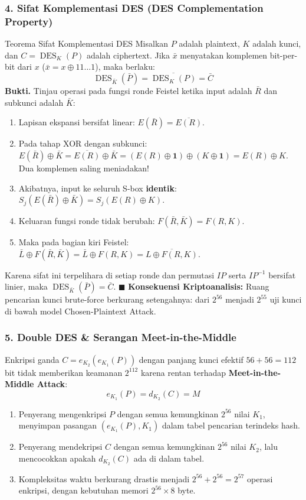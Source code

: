 \documentclass[11pt,a4paper]{article}
\newenvironment{proof}{\noindent\textbf{Bukti.}}{\hfill$\blacksquare$\vspace{0.3em}}
\begin{document}
\subsubsection{4. Sifat Komplementasi DES (DES Complementation Property)}
\begin{thmbox}{Teorema Sifat Komplementasi DES}
Misalkan $P$ adalah plaintext, $K$ adalah kunci, dan $C = \operatorname{DES}_K(P)$ adalah ciphertext. Jika $\bar{x}$ menyatakan komplemen bit-per-bit dari $x$ ($\bar{x} = x \oplus 11\dots1$), maka berlaku:
\[
\operatorname{DES}_{\bar{K}}(\bar{P}) = \overline{\operatorname{DES}_K(P)} = \bar{C}
\]
\begin{proof}
Tinjau operasi pada fungsi ronde Feistel ketika input adalah $\bar{R}$ dan subkunci adalah $\bar{K}$:
\begin{enumerate}
    \item Lapisan ekspansi bersifat linear: $E(\bar{R}) = \overline{E(R)}$.
    \item Pada tahap XOR dengan subkunci: $E(\bar{R}) \oplus \bar{K} = \overline{E(R)} \oplus \bar{K} = (E(R) \oplus \mathbf{1}) \oplus (K \oplus \mathbf{1}) = E(R) \oplus K$. Dua komplemen saling meniadakan!
    \item Akibatnya, input ke seluruh S-box \textbf{identik}: $S_j(E(\bar{R}) \oplus \bar{K}) = S_j(E(R) \oplus K)$.
    \item Keluaran fungsi ronde tidak berubah: $F(\bar{R}, \bar{K}) = F(R, K)$.
    \item Maka pada bagian kiri Feistel: $\bar{L} \oplus F(\bar{R}, \bar{K}) = \bar{L} \oplus F(R, K) = \overline{L \oplus F(R, K)}$.
\end{enumerate}
Karena sifat ini terpelihara di setiap ronde dan permutasi $IP$ serta $IP^{-1}$ bersifat linier, maka $\operatorname{DES}_{\bar{K}}(\bar{P}) = \bar{C}$.
\end{proof}
\textbf{Konsekuensi Kriptoanalisis:} Ruang pencarian kunci brute-force berkurang setengahnya: dari $2^{56}$ menjadi $2^{55}$ uji kunci di bawah model Chosen-Plaintext Attack.
\end{thmbox}

\subsubsection{5. Double DES \& Serangan Meet-in-the-Middle}
Enkripsi ganda $C = e_{K_2}(e_{K_1}(P))$ dengan panjang kunci efektif $56 + 56 = 112$ bit tidak memberikan keamanan $2^{112}$ karena rentan terhadap \textbf{Meet-in-the-Middle Attack}:
\[
e_{K_1}(P) = d_{K_2}(C) = M
\]
\begin{enumerate}[leftmargin=*]
    \item Penyerang mengenkripsi $P$ dengan semua kemungkinan $2^{56}$ nilai $K_1$, menyimpan pasangan $(e_{K_1}(P), K_1)$ dalam tabel pencarian terindeks hash.
    \item Penyerang mendekripsi $C$ dengan semua kemungkinan $2^{56}$ nilai $K_2$, lalu mencocokkan apakah $d_{K_2}(C)$ ada di dalam tabel.
    \item Kompleksitas waktu berkurang drastis menjadi $2^{56} + 2^{56} = 2^{57}$ operasi enkripsi, dengan kebutuhan memori $2^{56} \times 8$ byte.
\end{enumerate}
\end{document}
